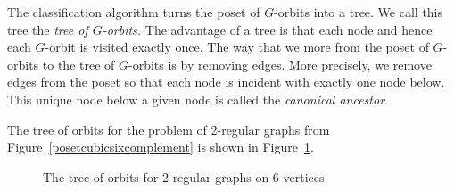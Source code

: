 \bigskip





The classification algorithm turns the poset of $G$-orbits into a tree.
We call this tree the {\em tree of $G$-orbits.}
The advantage of a tree is that each node and hence each $G$-orbit is visited exactly once.
The way that we more from the poset of $G$-orbits to the tree of $G$-orbits 
is by removing edges.
More precisely, we remove edges from the poset 
so that each node is incident with 
exactly one node below. 
This unique node below a given node is called 
the {\em canonical ancestor}.


\bigskip



The tree of orbits for the problem of 2-regular graphs from Figure~\ref{posetcubicsixcomplement} 
is shown in Figure~\ref{treecubicsixcomplement}.
\begin{figure}
\begin{center}
 
\end{center}
\caption{\label{treecubicsixcomplement}The tree of orbits for 2-regular graphs on 6 vertices}
\end{figure}


\bigskip









